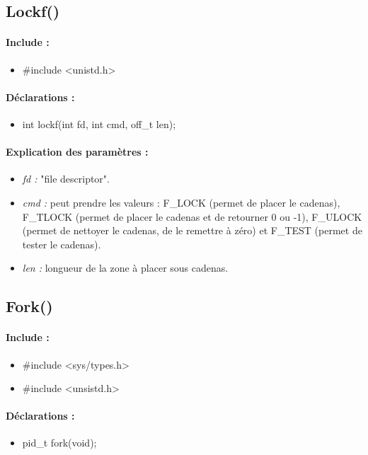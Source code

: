 \documentclass{article}[12pt]
\begin{document}
\subsection{Lockf()}
\paragraph{Include : }
\begin{itemize}
	\item \#include <unistd.h>
\end{itemize}
\paragraph{Déclarations : }
\begin{itemize}
	\item int lockf(int fd, int cmd, off\_t len);
\end{itemize}
\paragraph{Explication des paramètres : }
\begin{itemize}
	\item \emph{fd : } "file descriptor".
	\item \emph{cmd : } peut prendre les valeurs : F\_LOCK (permet de placer le cadenas), F\_TLOCK (permet de placer le cadenas et de retourner 0 ou -1), F\_ULOCK (permet de nettoyer le cadenas, de le remettre à zéro) et F\_TEST (permet de tester le cadenas).
	\item \emph{len :} longueur de la zone à placer sous cadenas.
\end{itemize}
\subsection{Fork()}
\paragraph{Include : }
\begin{itemize}
	\item \#include <sys/types.h>
    \item \#include <unsistd.h>
\end{itemize}
\paragraph{Déclarations : }
\begin{itemize}
	\item pid\_t fork(void);
\end{itemize}
\end{document}
